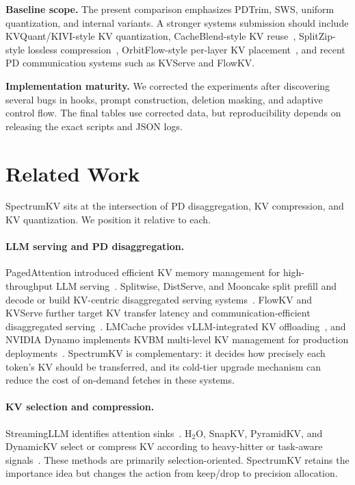 \documentclass[11pt]{article}
\newcommand{\method}{SpectrumKV}
\theoremstyle{plain}
\theoremstyle{definition}
\begin{document}
\textbf{Baseline scope.}  The present comparison emphasizes PDTrim, SWS, uniform quantization, and internal variants.  A stronger systems submission should include KVQuant/KIVI-style KV quantization, CacheBlend-style KV reuse~\citep{cacheblend}, SplitZip-style lossless compression~\citep{splitzip}, OrbitFlow-style per-layer KV placement~\citep{orbitflow}, and recent PD communication systems such as KVServe and FlowKV.

\textbf{Implementation maturity.}  We corrected the experiments after discovering several bugs in hooks, prompt construction, deletion masking, and adaptive control flow.  The final tables use corrected data, but reproducibility depends on releasing the exact scripts and JSON logs.

\section{Related Work}
\label{sec:related}

\method{} sits at the intersection of PD disaggregation, KV compression, and KV quantization.  We position it relative to each.

\paragraph{LLM serving and PD disaggregation.}
PagedAttention introduced efficient KV memory management for high-throughput LLM serving~\citep{pagedattention}.  Splitwise, DistServe, and Mooncake split prefill and decode or build KV-centric disaggregated serving systems~\citep{splitwise,distserve,mooncake}.  FlowKV and KVServe further target KV transfer latency and communication-efficient disaggregated serving~\citep{flowkv,kvserve}.  LMCache provides vLLM-integrated KV offloading~\citep{lmcache}, and NVIDIA Dynamo implements KVBM multi-level KV management for production deployments~\citep{nvidiadynamo}.  \method{} is complementary: it decides how precisely each token's KV should be transferred, and its cold-tier upgrade mechanism can reduce the cost of on-demand fetches in these systems.

\paragraph{KV selection and compression.}
StreamingLLM identifies attention sinks~\citep{streamingllm}.  H$_2$O, SnapKV, PyramidKV, and DynamicKV select or compress KV according to heavy-hitter or task-aware signals~\citep{h2o,snapkv,pyramidkv,dynamickv}.  These methods are primarily selection-oriented.  \method{} retains the importance idea but changes the action from keep/drop to precision allocation.
\end{document}
